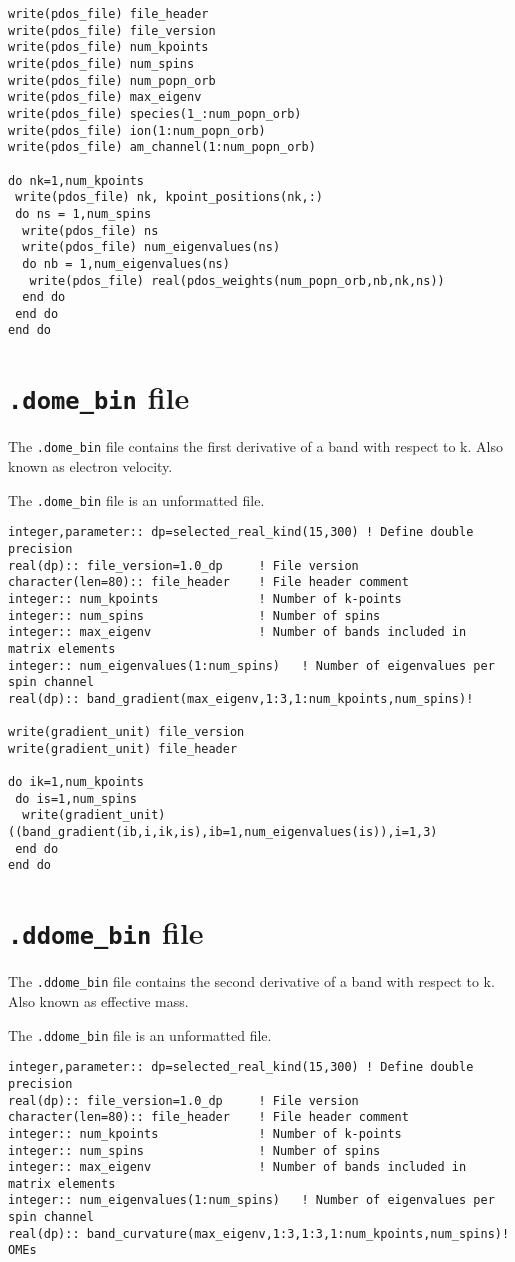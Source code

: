 \documentclass[a4paper,11pt,twoside]{book}
\begin{document}
\begin{appendix}
\begin{verbatim}
write(pdos_file) file_header
write(pdos_file) file_version
write(pdos_file) num_kpoints
write(pdos_file) num_spins
write(pdos_file) num_popn_orb
write(pdos_file) max_eigenv
write(pdos_file) species(1_:num_popn_orb)
write(pdos_file) ion(1:num_popn_orb)
write(pdos_file) am_channel(1:num_popn_orb)
       
do nk=1,num_kpoints
 write(pdos_file) nk, kpoint_positions(nk,:)
 do ns = 1,num_spins
  write(pdos_file) ns
  write(pdos_file) num_eigenvalues(ns)
  do nb = 1,num_eigenvalues(ns)
   write(pdos_file) real(pdos_weights(num_popn_orb,nb,nk,ns))
  end do
 end do
end do
\end{verbatim}

\section{\texttt{.dome\_bin} file}
The \texttt{.dome\_bin} file contains the first derivative of a band with respect to k. Also known as electron velocity. 

The \texttt{.dome\_bin} file is an unformatted file.
\begin{verbatim}
integer,parameter:: dp=selected_real_kind(15,300) ! Define double precision
real(dp):: file_version=1.0_dp     ! File version
character(len=80):: file_header    ! File header comment
integer:: num_kpoints              ! Number of k-points
integer:: num_spins                ! Number of spins
integer:: max_eigenv               ! Number of bands included in matrix elements
integer:: num_eigenvalues(1:num_spins)   ! Number of eigenvalues per spin channel
real(dp):: band_gradient(max_eigenv,1:3,1:num_kpoints,num_spins)!

write(gradient_unit) file_version
write(gradient_unit) file_header

do ik=1,num_kpoints
 do is=1,num_spins
  write(gradient_unit) ((band_gradient(ib,i,ik,is),ib=1,num_eigenvalues(is)),i=1,3)
 end do
end do
\end{verbatim}

\section{\texttt{.ddome\_bin} file}
The \texttt{.ddome\_bin} file contains the second derivative of a band with respect to k. Also known as effective mass. 

The \texttt{.ddome\_bin} file is an unformatted file.
\begin{verbatim}
integer,parameter:: dp=selected_real_kind(15,300) ! Define double precision
real(dp):: file_version=1.0_dp     ! File version
character(len=80):: file_header    ! File header comment
integer:: num_kpoints              ! Number of k-points
integer:: num_spins                ! Number of spins
integer:: max_eigenv               ! Number of bands included in matrix elements
integer:: num_eigenvalues(1:num_spins)   ! Number of eigenvalues per spin channel
real(dp):: band_curvature(max_eigenv,1:3,1:3,1:num_kpoints,num_spins)! OMEs


\end{verbatim}
\end{appendix}
\end{document}
